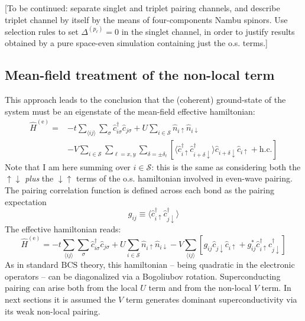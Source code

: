 {\color{tabred}
	[To be continued: separate singlet and triplet pairing channels, and describe triplet channel by itself by the means of four-components Nambu spinors. Use selection rules to set $\Delta^{(p_\ell)}=0$ in the singlet channel, in order to justify results obtained by a pure space-even simulation containing just the o.s. terms.]
}

\subsection{Mean-field treatment of the non-local term}

This approach leads to the conclusion that the (coherent) ground-state of the system must be an eigenstate of the mean-field effective hamiltonian:
\begin{equation}\label{eq:extended-hubbard-model-effective-intermediate}
	\begin{aligned}
		\hat H^{(\mathrm{e})} =
		&-t \sum_{\langle ij \rangle} \sum_\sigma \hat c_{i\sigma}^\dagger \hat c_{j\sigma}
		+ U \sum_{i \in \mathcal{S}} \hat n_{i\uparrow} \hat n_{i\downarrow} \\
		&- V \sum_{i \in \mathcal{S}} \sum_{\ell = x,y} \sum_{\delta = \pm \delta_\ell} \left[
			\langle 
				\hat c_{i\uparrow}^\dagger \hat c_{i + \delta \downarrow}^\dagger
			\rangle
			\hat c_{i + \delta \downarrow} \hat c_{i\uparrow} 
			+ \mathrm{h}.\mathrm{c}.
		\right]
	\end{aligned}
\end{equation}
Note that I am here summing over $i\in \mathcal{S}$: this is the same as considering both the $\uparrow\downarrow$ \textit{plus} the $\downarrow\uparrow$ terms of the o.s. hamiltonian involved in even-wave pairing. The pairing correlation function is defined across each bond as the pairing expectation
\[
	g_{ij} \equiv \langle 
		\hat c_{i\uparrow}^\dagger \hat c_{j\downarrow}^\dagger
	\rangle
\]
The effective hamiltonian reads:
\begin{equation}\label{eq:extended-hubbard-model-effective-intermediate-2}
	\hat H^{(\mathrm{e})} =
	-t \sum_{\langle ij \rangle} \sum_\sigma \hat c_{i\sigma}^\dagger \hat c_{j\sigma}
	+ U \sum_{i \in \mathcal{S}} \hat n_{i\uparrow} \hat n_{i\downarrow}
	- V \sum_{\langle ij \rangle} \left[
		g_{ij} \hat c_{j\downarrow} \hat c_{i\uparrow} + g_{ij}^* \hat c_{i\uparrow}^\dagger \hat c_{j\downarrow}^\dagger
	\right]
\end{equation}
As in standard $\mathrm{BCS}$ theory, this hamiltonian -- being quadratic in the electronic operators -- can be diagonalized via a Bogoliubov rotation. Superconducting pairing can arise both from the local $U$ term and from the non-local $V$ term. In next sections it is assumed the $V$ term generates dominant superconductivity via its weak non-local pairing.

